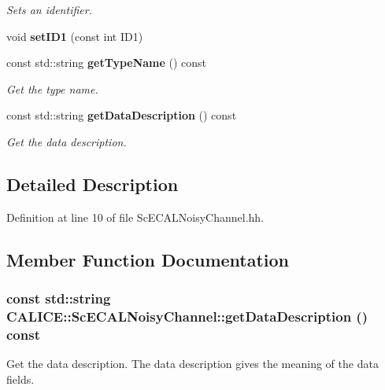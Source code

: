 \begin{DoxyCompactItemize}
\begin{DoxyCompactList}\small\item\em Sets an identifier. \item\end{DoxyCompactList}\item 
void {\bfseries setID1} (const int ID1)\label{classCALICE_1_1ScECALNoisyChannel_a714bd05d4d33c055749739cd74ea8c5f}

\item 
const std::string {\bf getTypeName} () const 
\begin{DoxyCompactList}\small\item\em Get the type name. \item\end{DoxyCompactList}\item 
const std::string {\bf getDataDescription} () const 
\begin{DoxyCompactList}\small\item\em Get the data description. \item\end{DoxyCompactList}\end{DoxyCompactItemize}


\subsection{Detailed Description}


Definition at line 10 of file ScECALNoisyChannel.hh.

\subsection{Member Function Documentation}
\subsubsection[{getDataDescription}]{\setlength{\rightskip}{0pt plus 5cm}const std::string CALICE::ScECALNoisyChannel::getDataDescription () const\hspace{0.3cm}{\ttfamily  [inline]}}\label{classCALICE_1_1ScECALNoisyChannel_aa9bb25714d94b0edc4f22a48f34f44f1}


Get the data description. The data description gives the meaning of the data fields. 

